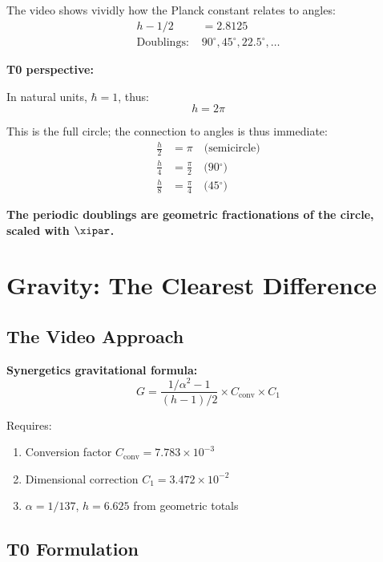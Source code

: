 	The video shows vividly how the Planck constant relates to angles:
	\begin{align}
		h - 1/2 &= 2.8125 \\
		\text{Doublings: } &90^\circ, 45^\circ, 22.5^\circ, \ldots
	\end{align}
	
	\begin{vorteil}
		\textbf{T0 perspective:}
		
		In natural units, $\hbar = 1$, thus:
		\begin{equation}
			h = 2\pi
		\end{equation}
		
		This is the full circle; the connection to angles is thus immediate:
		\begin{align}
			\frac{h}{2} &= \pi \quad \text{(semicircle)} \\
			\frac{h}{4} &= \frac{\pi}{2} \quad \text{(90$^\circ$)} \\
			\frac{h}{8} &= \frac{\pi}{4} \quad \text{(45$^\circ$)}
		\end{align}
		
		\textbf{The periodic doublings are geometric fractionations of the circle, scaled with $\xipar$.}
	\end{vorteil}
	
	\section{Gravity: The Clearest Difference}
	
	\subsection{The Video Approach}
	
	\textbf{Synergetics gravitational formula:}
	\begin{equation}
		G = \frac{1/\alpha^2 - 1}{(h - 1)/2} \times C_{\text{conv}} \times C_1
	\end{equation}
	
	Requires:
	\begin{enumerate}
		\item Conversion factor $C_{\text{conv}} = 7.783 \times 10^{-3}$
		\item Dimensional correction $C_1 = 3.472 \times 10^{-2}$
		\item $\alpha = 1/137$, $h=6.625$ from geometric totals
	\end{enumerate}
	
	\subsection{T0 Formulation}
	
